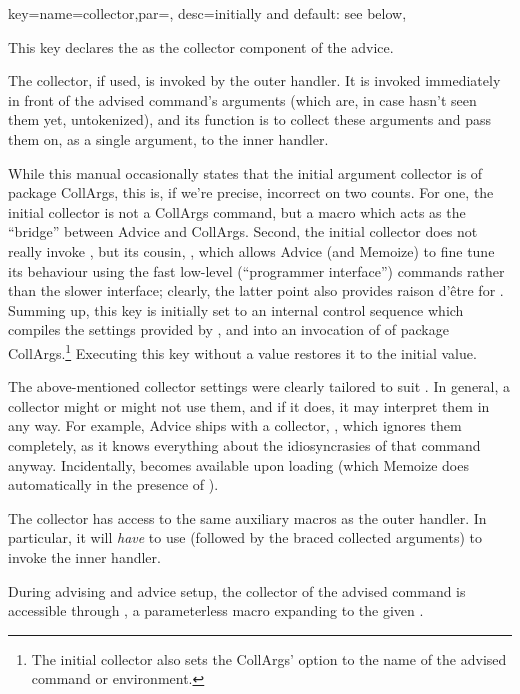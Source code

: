 \documentclass[a4paper,11pt]{article}
\begin{document}
\begin{doc}{
    key={name=collector,par=,
      desc=initially and default: see below},
  }

  This key declares the  as the collector component of
  the advice.
  
  The collector, if used, is invoked by the outer handler.  It is invoked
  immediately in front of the advised command's arguments (which are, in case
   hasn't seen them yet, untokenized), and its function is to
  collect these arguments and pass them on, as a single argument, to the inner
  handler.

  While this manual occasionally states that the initial argument collector is
   of package CollArgs, this is, if we're precise,
  incorrect on two counts.  For one, the initial collector is not a CollArgs
  command, but a macro which acts as the ``bridge'' between Advice
  and CollArgs. Second, the initial collector does not really invoke
  , but its cousin, ,
  which allows Advice (and Memoize) to fine tune its behaviour
  using the fast low-level (``programmer interface'') commands rather than the
  slower  interface; clearly, the latter point also provides
  raison d'être for .  Summing up, this key
  is initially set to an internal control sequence which compiles the settings
  provided by ,  and
   into an invocation of
   of package CollArgs.\footnote{The initial
    collector also sets the CollArgs' option  to the
    name of the advised command or environment.}  Executing this key without a
  value restores it to the initial value.

  The above-mentioned collector settings were clearly tailored to suit
  .  In general, a collector might or might not use
  them, and if it does, it may interpret them in any way.  For example, Advice
  ships with a  collector, , which
  ignores them completely, as it knows everything about the idiosyncrasies of
  that command anyway.  Incidentally,  becomes
  available upon loading  (which Memoize does
  automatically in the presence of \TikZ).

  The collector has access to the same auxiliary macros as the outer handler.
  In particular, it will \emph{have} to use  (followed
  by the braced collected arguments) to invoke the inner handler.
  
  During advising and advice setup, the collector of the advised command is
  accessible through , a parameterless macro
  expanding to the given .
\end{doc}
\end{document}
